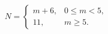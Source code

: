 \documentclass[border=2.5pt]{standalone}
\begin{document}
$\displaystyle N=\begin{cases}m+6,&0\le m<5,\\11,&m\ge5.\end{cases}$
\end{document}
